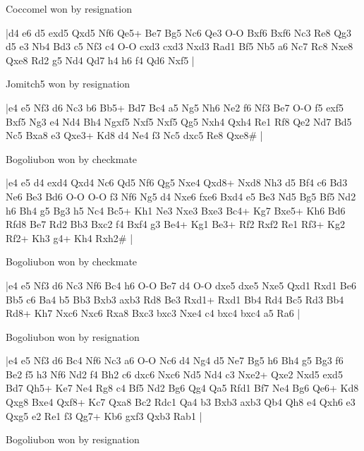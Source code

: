 \showboard

Coccomel won by resignation

\makegametitle
|d4 e6 d5 exd5 Qxd5 Nf6 Qe5+ Be7 Bg5 Nc6 Qe3 O-O Bxf6 Bxf6 Nc3 Re8 Qg3 d5 e3 Nb4 Bd3 c5 Nf3 c4 O-O cxd3 cxd3 Nxd3 Rad1 Bf5 Nb5 a6 Nc7 Rc8 Nxe8 Qxe8 Rd2 g5 Nd4 Qd7 h4 h6 f4 Qd6 Nxf5  |

\showboard

Jomitch5 won by resignation

\makegametitle
|e4 e5 Nf3 d6 Nc3 b6 Bb5+ Bd7 Bc4 a5 Ng5 Nh6 Ne2 f6 Nf3 Be7 O-O f5 exf5 Bxf5 Ng3 e4 Nd4 Bh4 Ngxf5 Nxf5 Nxf5 Qg5 Nxh4 Qxh4 Re1 Rf8 Qe2 Nd7 Bd5 Nc5 Bxa8 e3 Qxe3+ Kd8 d4 Ne4 f3 Nc5 dxc5 Re8 Qxe8\#  |

\showboard

Bogoliubon won by checkmate

\makegametitle
|e4 e5 d4 exd4 Qxd4 Nc6 Qd5 Nf6 Qg5 Nxe4 Qxd8+ Nxd8 Nh3 d5 Bf4 c6 Bd3 Ne6 Be3 Bd6 O-O O-O f3 Nf6 Ng5 d4 Nxe6 fxe6 Bxd4 e5 Be3 Nd5 Bg5 Bf5 Nd2 h6 Bh4 g5 Bg3 h5 Nc4 Bc5+ Kh1 Ne3 Nxe3 Bxe3 Bc4+ Kg7 Bxe5+ Kh6 Bd6 Rfd8 Be7 Rd2 Bb3 Bxc2 f4 Bxf4 g3 Be4+ Kg1 Be3+ Rf2 Rxf2 Re1 Rf3+ Kg2 Rf2+ Kh3 g4+ Kh4 Rxh2\#  |

\showboard

Bogoliubon won by checkmate

\makegametitle
|e4 e5 Nf3 d6 Nc3 Nf6 Bc4 h6 O-O Be7 d4 O-O dxe5 dxe5 Nxe5 Qxd1 Rxd1 Be6 Bb5 c6 Ba4 b5 Bb3 Bxb3 axb3 Rd8 Be3 Rxd1+ Rxd1 Bb4 Rd4 Bc5 Rd3 Bb4 Rd8+ Kh7 Nxc6 Nxc6 Rxa8 Bxc3 bxc3 Nxe4 c4 bxc4 bxc4 a5 Ra6  |

\showboard

Bogoliubon won by resignation

\makegametitle
|e4 e5 Nf3 d6 Bc4 Nf6 Nc3 a6 O-O Nc6 d4 Ng4 d5 Ne7 Bg5 h6 Bh4 g5 Bg3 f6 Be2 f5 h3 Nf6 Nd2 f4 Bh2 c6 dxc6 Nxc6 Nd5 Nd4 c3 Nxe2+ Qxe2 Nxd5 exd5 Bd7 Qh5+ Ke7 Ne4 Rg8 c4 Bf5 Nd2 Bg6 Qg4 Qa5 Rfd1 Bf7 Ne4 Bg6 Qe6+ Kd8 Qxg8 Bxe4 Qxf8+ Kc7 Qxa8 Bc2 Rdc1 Qa4 b3 Bxb3 axb3 Qb4 Qh8 e4 Qxh6 e3 Qxg5 e2 Re1 f3 Qg7+ Kb6 gxf3 Qxb3 Rab1  |

\showboard

Bogoliubon won by resignation

